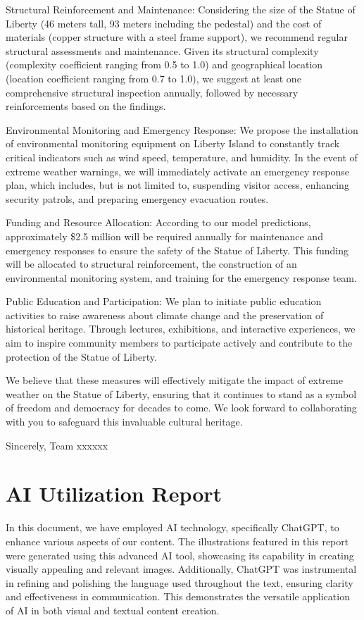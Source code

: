 \documentclass[12pt]{article}
\begin{document}
Structural Reinforcement and Maintenance: Considering the size of the Statue of Liberty (46 meters tall, 93 meters including the pedestal) and the cost of materials (copper structure with a steel frame support), we recommend regular structural assessments and maintenance. Given its structural complexity (complexity coefficient ranging from 0.5 to 1.0) and geographical location (location coefficient ranging from 0.7 to 1.0), we suggest at least one comprehensive structural inspection annually, followed by necessary reinforcements based on the findings.

Environmental Monitoring and Emergency Response: We propose the installation of environmental monitoring equipment on Liberty Island to constantly track critical indicators such as wind speed, temperature, and humidity. In the event of extreme weather warnings, we will immediately activate an emergency response plan, which includes, but is not limited to, suspending visitor access, enhancing security patrols, and preparing emergency evacuation routes.

Funding and Resource Allocation: According to our model predictions, approximately \$2.5 million will be required annually for maintenance and emergency responses to ensure the safety of the Statue of Liberty. This funding will be allocated to structural reinforcement, the construction of an environmental monitoring system, and training for the emergency response team.

Public Education and Participation: We plan to initiate public education activities to raise awareness about climate change and the preservation of historical heritage. Through lectures, exhibitions, and interactive experiences, we aim to inspire community members to participate actively and contribute to the protection of the Statue of Liberty.

We believe that these measures will effectively mitigate the impact of extreme weather on the Statue of Liberty, ensuring that it continues to stand as a symbol of freedom and democracy for decades to come. We look forward to collaborating with you to safeguard this invaluable cultural heritage.

Sincerely,
Team xxxxxx
\clearpage





\section*{AI Utilization Report}
In this document, we have employed AI technology, specifically ChatGPT, to enhance various aspects of our content. The illustrations featured in this report were generated using this advanced AI tool, showcasing its capability in creating visually appealing and relevant images. Additionally, ChatGPT was instrumental in refining and polishing the language used throughout the text, ensuring clarity and effectiveness in communication. This demonstrates the versatile application of AI in both visual and textual content creation.
	

\end{document}
